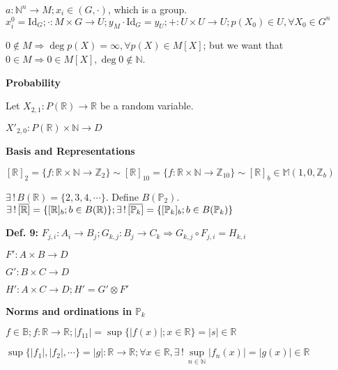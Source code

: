 \documentclass[10pt,a4paper]{article}
\newcommand{\overbar}[1]{\mkern 1.5mu\overline{\mkern-1.5mu#1\mkern-1.5mu}\mkern 1.5mu}
\begin{document}
$a : \mathbb{N}^n \rightarrow M; x_i \in (G, \cdot)$, which is a group. $x_i^0 = \text{Id}_G ; \cdot : M \times G \rightarrow U ; y_M \cdot \text{Id}_G = y_U ; + : U \times U \rightarrow U ; p(X_0) \in U, \forall X_0 \in G^n$

$0 \notin M \Rightarrow \deg p(X) = \infty, \forall p(X) \in M[X]$; but we want that $0 \in M \Rightarrow 0 \in M[X], \deg 0 \notin \mathbb{N}$.

\vspace{3mm}

\textbf{Probability}

Let $X_{2,1} : P(\mathbb{R}) \rightarrow \mathbb{R}$ be a random variable.

$X'_{2,0} : P(\mathbb{R}) \times \mathbb{N} \rightarrow D$

\vspace{3mm}

\textbf{Basis and Representations}

$[\mathbb{R}]_2 = \{f : \mathbb{R} \times \mathbb{N} \rightarrow \mathbb{Z}_2 \} \sim [\mathbb{R}]_{10} = \{f : \mathbb{R} \times \mathbb{N} \rightarrow \mathbb{Z}_{10} \} \sim [\mathbb{R}]_b \in \mathbb{M}(1, 0, \mathbb{Z}_b)$

$\exists \,!\, B(\mathbb{R}) = \{ 2, 3, 4, \cdots \}$. Define $B(\mathbb{P}_2)$. $\exists \,!\, \overbar{[\mathbb{R}]} = \{[\mathbb{R}]_b ; b \in B(\mathbb{R}) \} ; \exists \,!\, \overbar{[\mathbb{P}_k]} = \{[\mathbb{P}_k]_b ; b \in B(\mathbb{P}_k) \}$

\vspace{3mm}

\textbf{Def. 9:} $F_{j, i} : A_i \rightarrow B_j ; G_{k, j} : B_j \rightarrow C_k \Rightarrow G_{k, j} \circ F_{j, i} = H_{k, i} $

$F' : A \times B \rightarrow D$

$G' : B \times C \rightarrow D$

$H' : A \times C \rightarrow D ; H' = G' \otimes F'$

\vspace{3mm}

\textbf{Norms and ordinations in }$\mathbb{P}_k$

$f \in \mathbb{B} ; f : \mathbb{R} \rightarrow \mathbb{R} ; \vert f_{11} \vert = \sup \{ \vert f(x) \vert ; x \in \mathbb{R} \} = \vert s \vert \in \mathbb{R}$

$\sup \{ \vert f_1 \vert, \vert f_2 \vert, \cdots \} = \vert g \vert : \mathbb{R} \rightarrow \mathbb{R} ; \forall x \in \mathbb{R}, \exists \, ! \, \underset{n \in \mathbb{N}}{\sup} \vert f_n(x) \vert = \vert g(x) \vert \in \mathbb{R}$
\end{document}
